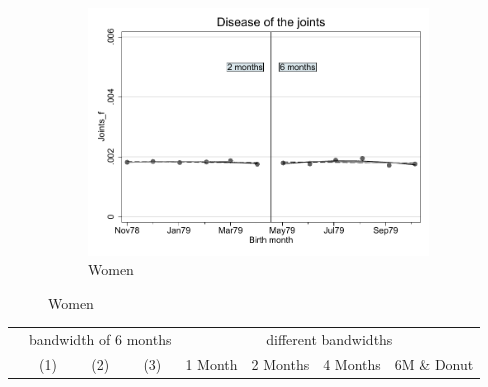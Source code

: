 \documentclass[a4paper ]{article}
\begin{document}
\begin{figure}[h]
\begin{subfigure}[t]{0.31\textwidth}
		\centering
		\includegraphics[width=0.99\textwidth]{R1_RD_Joints_f_fits}
		\caption{Women}
	\end{subfigure}
\end{figure}


\begin{table}[h]\centering
\def\sym#1{\ifmmode^{#1}\else\(^{#1}\)\fi}
\begin{tabular}{l*{3}{c}|cccc}
\toprule
&\multicolumn{3}{c}{bandwidth of 6 months} & \multicolumn{4}{c}{different bandwidths} \\
 \cmidrule(lr{1em}){2-4} \cmidrule(lr{1em}){5-8}
 &\multicolumn{1}{c}{(1)}&\multicolumn{1}{c}{(2)}&\multicolumn{1}{c}{(3)}& 1 Month & 2 Months & 4 Months & 6M \& Donut \\
\midrule 

\bottomrule
\end{tabular}
\end{table}
\end{document}
